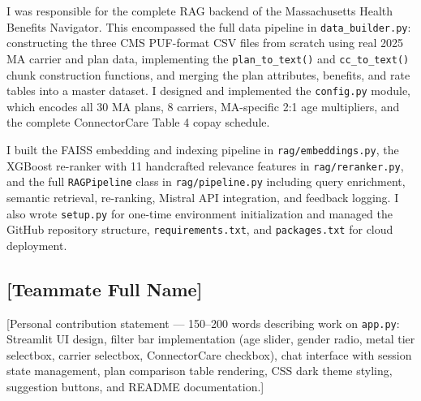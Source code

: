 \documentclass[12pt, letterpaper]{article}
\begin{document}
I was responsible for the complete RAG backend of the Massachusetts Health Benefits Navigator. This encompassed the full data pipeline in \texttt{data\_builder.py}: constructing the three CMS PUF-format CSV files from scratch using real 2025 MA carrier and plan data, implementing the \texttt{plan\_to\_text()} and \texttt{cc\_to\_text()} chunk construction functions, and merging the plan attributes, benefits, and rate tables into a master dataset. I designed and implemented the \texttt{config.py} module, which encodes all 30 MA plans, 8 carriers, MA-specific 2:1 age multipliers, and the complete ConnectorCare Table 4 copay schedule.

I built the FAISS embedding and indexing pipeline in \texttt{rag/embeddings.py}, the XGBoost re-ranker with 11 handcrafted relevance features in \texttt{rag/reranker.py}, and the full \texttt{RAGPipeline} class in \texttt{rag/pipeline.py} including query enrichment, semantic retrieval, re-ranking, Mistral API integration, and feedback logging. I also wrote \texttt{setup.py} for one-time environment initialization and managed the GitHub repository structure, \texttt{requirements.txt}, and \texttt{packages.txt} for cloud deployment.

\subsection*{[Teammate Full Name]}

[Personal contribution statement --- 150--200 words describing work on \texttt{app.py}: Streamlit UI design, filter bar implementation (age slider, gender radio, metal tier selectbox, carrier selectbox, ConnectorCare checkbox), chat interface with session state management, plan comparison table rendering, CSS dark theme styling, suggestion buttons, and README documentation.]
\end{document}
